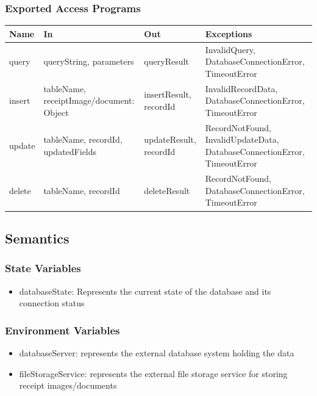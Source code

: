 \documentclass[12pt, titlepage]{article}
\begin{document}
\subsubsection{Exported Access Programs}

\begin{center}
\begin{tabular}{p{2.8cm} p{3.4cm} p{2.8cm} p{5.6cm}}
\toprule
\textbf{Name} & \textbf{In} & \textbf{Out} & \textbf{Exceptions} \\
\midrule
query & queryString, parameters & queryResult & InvalidQuery, DatabaseConnectionError, TimeoutError \\
insert & tableName, receiptImage/document: Object & insertResult, recordId & InvalidRecordData, DatabaseConnectionError, TimeoutError \\
update & tableName, recordId, updatedFields & updateResult, recordId & RecordNotFound, InvalidUpdateData, DatabaseConnectionError, TimeoutError \\
delete & tableName, recordId & deleteResult & RecordNotFound, DatabaseConnectionError, TimeoutError \\
\bottomrule
\end{tabular}
\end{center}

\subsection{Semantics}

\subsubsection{State Variables}

\begin{itemize}
  \item databaseState: Represents the current state of the database and its connection status
\end{itemize}

\subsubsection{Environment Variables}

\begin{itemize}
  \item databaseServer: represents the external database system holding the data
  \item fileStorageService: represents the external file storage service for storing receipt images/documents
\end{itemize}
\end{document}
